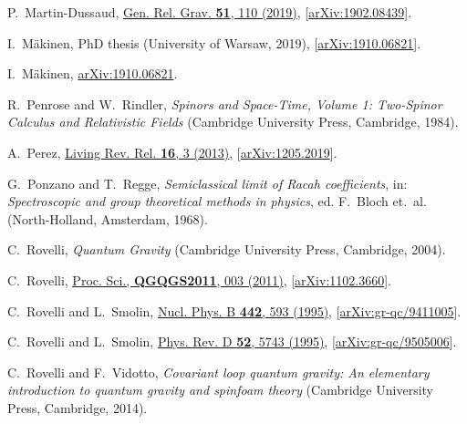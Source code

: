 \documentclass[graybox, secnum]{svmult}
\begin{document}
\begin{thebibliography}{99}
P.~Martin-Dussaud, %
  \href{http://dx.doi.org/10.1007/s10714-019-2583-5}{Gen. Rel.
  Grav. {\bfseries 51}, 110 (2019)},
  [\href{http://arxiv.org/abs/1902.08439}{arXiv:1902.08439}].

I.~M\"akinen,
  PhD thesis (University of Warsaw, 2019),
  [\href{http://arxiv.org/abs/1910.06821}{arXiv:1910.06821}].

I.~M\"akinen, %
  \href{http://arxiv.org/abs/1910.06821}{arXiv:1910.06821}.

R.~Penrose and W.~Rindler, {\em Spinors and Space-Time, Volume 1: Two-Spinor Calculus and Relativistic Fields} (Cambridge University Press, Cambridge, 1984).

A.~Perez, %
  \href{http://dx.doi.org/10.12942/lrr-2013-3}{Living Rev. Rel. {\bfseries 16},
  3 (2013)}, [\href{http://arxiv.org/abs/1205.2019}{arXiv:1205.2019}].

G.~Ponzano and T.~Regge,
{\em Semiclassical limit of Racah coefficients},
in: {\em Spectroscopic and group theoretical methods in physics}, ed. F.~Bloch et.~al.
(North-Holland, Amsterdam, 1968).

C.~Rovelli, {\em {Quantum Gravity}} (Cambridge University Press, Cambridge, 2004).

C.~Rovelli, 
  \href{http://dx.doi.org/10.22323/1.140.0003}{Proc. Sci., {\bfseries
  QGQGS2011}, 003 (2011)},
  [\href{http://arxiv.org/abs/1102.3660}{arXiv:1102.3660}].

C.~Rovelli and L.~Smolin, %
  \href{http://dx.doi.org/10.1016/0550-3213(95)00150-Q}{Nucl. Phys. B
  {\bfseries 442}, 593 (1995)},
  [\href{http://arxiv.org/abs/gr-qc/9411005}{arXiv:gr-qc/9411005}].

	C.~Rovelli and L.~Smolin, %
	\href{https://doi.org/10.1103/PhysRevD.52.5743}{Phys. Rev. D
  {\bfseries 52}, 5743 (1995)},
  [\href{http://arxiv.org/abs/gr-qc/9505006}{arXiv:gr-qc/9505006}].

	C.~Rovelli and F.~Vidotto, {\em Covariant loop quantum gravity:
  An elementary introduction to quantum gravity and spinfoam theory}
  (Cambridge University Press, Cambridge, 2014).


\end{thebibliography}
\end{document}
